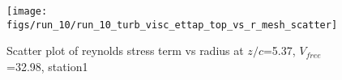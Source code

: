 \begin{figure}[H]
\centering
\texttt{[image: figs/run\_10/run\_10\_turb\_visc\_ettap\_top\_vs\_r\_mesh\_scatter]}
\caption{Scatter plot of reynolds stress term vs radius at $z/c$=5.37, $V_{free}$=32.98, station1}
\label{fig:run_10_turb_visc_ettap_top_vs_r_mesh_scatter}
\end{figure}


